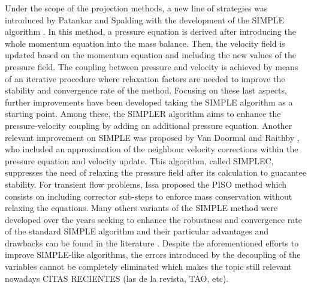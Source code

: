 \documentclass[final,3p,times,11pt,onecolumn]{myElsarticle}
\numberwithin{equation}{section}
\begin{document}
Under the scope of the projection methods, a new line of strategies was introduced by Patankar and Spalding with the development of the SIMPLE algorithm \cite{patankar1972}. In this method, a pressure equation is derived after introducing the whole momentum equation into the mass balance. Then, the velocity field is updated based on the momentum equation and including the new values of the pressure field. The coupling between pressure and velocity is achieved by means of an iterative procedure where  relaxation factors are needed to improve the stability and convergence rate of the method. Focusing on these last aspects, further improvements have been developed taking the SIMPLE algorithm as a starting
point. Among these, the SIMPLER algorithm \cite{patankar1980} aims to enhance the pressure-velocity coupling by adding an additional pressure equation. Another relevant improvement on SIMPLE was proposed by Van Doormal and Raithby \cite{vanDoormal}, who included an approximation of the neighbour velocity corrections within the pressure equation and velocity update. This algorithm, called SIMPLEC, suppresses the need of relaxing the pressure field after its calculation to guarantee stability. For transient flow problems, Issa proposed the PISO method \cite{issa,issa2} which consists on including corrector sub-steps to enforce mass conservation without relaxing the equations. Many others variants of the SIMPLE method were developed over the years seeking to enhance the robustness and convergence rate of the standard SIMPLE algorithm \cite{tao,qu,cheng2,sun} and their particular advantages and drawbacks can be found in the literature \cite{moukalled, liu, wang}. Despite the aforementioned efforts to improve SIMPLE-like algorithms, the errors introduced by the decoupling of the variables
cannot be completely eliminated which makes the topic still relevant nowadays {\color{red} CITAS RECIENTES (las de la revista, TAO, etc)}.
\end{document}
